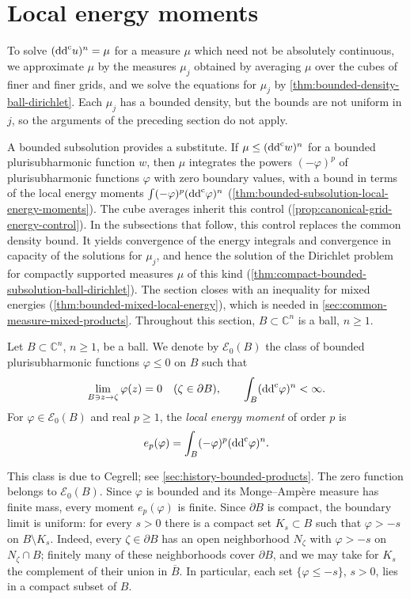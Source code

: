 \section{Local energy moments}
\label{sec:local-energy-moments}
To solve $(\mathrm{dd}^{\mathrm{c}} u)^n=\mu$ for a measure $\mu$ which need not be absolutely continuous, we approximate $\mu$ by the measures $\mu_j$ obtained by averaging $\mu$ over the cubes of finer and finer grids, and we solve the equations for $\mu_j$ by \cref{thm:bounded-density-ball-dirichlet}. Each $\mu_j$ has a bounded density, but the bounds are not uniform in $j$, so the arguments of the preceding section do not apply.

A bounded subsolution provides a substitute. If $\mu\le(\mathrm{dd}^{\mathrm{c}} w)^n$ for a bounded plurisubharmonic function $w$, then $\mu$ integrates the powers $(-\varphi)^p$ of plurisubharmonic functions $\varphi$ with zero boundary values, with a bound in terms of the local energy moments $\int(-\varphi)^p(\mathrm{dd}^{\mathrm{c}}\varphi)^n$ (\cref{thm:bounded-subsolution-local-energy-moments}). The cube averages inherit this control (\cref{prop:canonical-grid-energy-control}). In the subsections that follow, this control replaces the common density bound. It yields convergence of the energy integrals and convergence in capacity of the solutions for $\mu_j$, and hence the solution of the Dirichlet problem for compactly supported measures $\mu$ of this kind (\cref{thm:compact-bounded-subsolution-ball-dirichlet}). The section closes with an inequality for mixed energies (\cref{thm:bounded-mixed-local-energy}), which is needed in \cref{sec:common-measure-mixed-products}. Throughout this section, $B\subset\mathbb C^n$ is a ball, $n\geq1$.

\begin{definition}\label{def:bounded-zero-boundary-energy}
Let $B\subset\mathbb C^n$, $n\geq1$, be a ball. We denote by $\mathcal E_0(B)$ the class of bounded plurisubharmonic functions $\varphi\leq0$ on $B$ such that
\[
 \lim_{B\ni z\to\zeta}\varphi(z)=0\quad(\zeta\in\partial B),
 \qquad \int_B(\mathrm{dd}^{\mathrm{c}}\varphi)^n<\infty.
\]
For $\varphi\in\mathcal E_0(B)$ and real $p\geq1$, the \emph{local energy moment} of order $p$ is
\[
 e_p(\varphi)=\int_B(-\varphi)^p(\mathrm{dd}^{\mathrm{c}}\varphi)^n.
\]
\end{definition}
This class is due to Cegrell; see \cref{sec:history-bounded-products}. The zero function belongs to $\mathcal E_0(B)$. Since $\varphi$ is bounded and its Monge--Amp\`ere measure has finite mass, every moment $e_p(\varphi)$ is finite. Since $\partial B$ is compact, the boundary limit is uniform: for every $s>0$ there is a compact set $K_s\subset B$ such that $\varphi>-s$ on $B\setminus K_s$. Indeed, every $\zeta\in\partial B$ has an open neighborhood $N_\zeta$ with $\varphi>-s$ on $N_\zeta\cap B$; finitely many of these neighborhoods cover $\partial B$, and we may take for $K_s$ the complement of their union in $\overline B$. In particular, each set $\{\varphi\leq-s\}$, $s>0$, lies in a compact subset of $B$.

